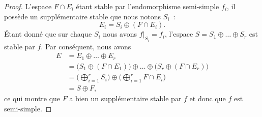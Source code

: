 \begin{proof}
    L'espace \( F\cap E_i\) étant stable par l'endomorphisme semi-simple \( f_i\), il possède un supplémentaire stable que nous notons \( S_i\)~:
    \begin{equation}
        E_i=S_i\oplus(F\cap E_i).
    \end{equation}
    Étant donné que sur chaque \( S_i\) nous avons \( f|_{S_i}=f_i\), l'espace \( S=S_1\oplus\ldots\oplus S_r\) est stable par \( f\). Par conséquent, nous avons
    \begin{subequations}
        \begin{align}
            E &= E_1\oplus\ldots\oplus E_r\\
              &= \big( S_1\oplus(F\cap E_1) \big)\oplus\ldots\oplus\big( S_r\oplus(F\cap E_r) \big)\\
              &= \big( \bigoplus_{i=1}^rS_i \big)\oplus\big( \bigoplus_{i=1}^rF\cap E_i \big)\\
              &= S\oplus F,
        \end{align}
    \end{subequations}
    ce qui montre que \( F\) a bien un supplémentaire stable par \( f\) et donc que \( f\) est semi-simple.
\end{proof}

